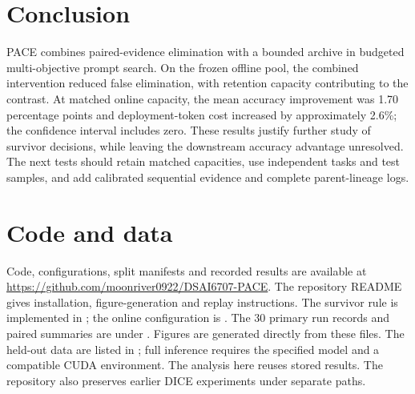 \documentclass{article}
\begin{document}
\section{Conclusion}
PACE combines paired-evidence elimination with a bounded archive in budgeted
multi-objective prompt search. On the frozen offline pool, the combined
intervention reduced false elimination, with retention capacity contributing
to the contrast. At matched online capacity, the mean accuracy improvement was
1.70 percentage points and deployment-token cost increased by approximately
2.6\%; the confidence interval includes zero. These results justify further
study of survivor decisions, while leaving the downstream accuracy advantage
unresolved. The next tests should retain matched capacities, use independent
tasks and test samples, and add calibrated sequential evidence and complete
parent-lineage logs.

\section*{Code and data}
Code, configurations, split manifests and recorded results are available at
\url{https://github.com/moonriver0922/DSAI6707-PACE}. The repository README gives
installation, figure-generation and replay instructions. The survivor rule is
implemented in ; the online configuration is
. The 30 primary run records and
paired summaries are under .
Figures are generated directly from these files. The held-out data are listed
in ; full inference requires the specified model
and a compatible CUDA environment. The analysis here reuses stored results.
The repository also preserves earlier DICE experiments under separate paths.
\end{document}
